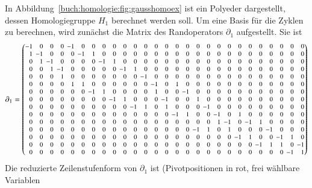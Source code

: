 \begin{beispiel}
\label{buch:homologie:beispiel:gausshomo}
In Abbildung~\ref{buch:homologie:fig:gausshomoex} ist ein Polyeder 
dargestellt, dessen Homologiegruppe $H_1$ berechnet werden soll.
Um eine Basis für die Zyklen zu berechnen, wird zunächst die Matrix
des Randoperators $\partial_1$ aufgestellt.
Sie ist
\[
\setcounter{MaxMatrixCols}{27}
\partial_1
=
\footnotesize
\setlength\arraycolsep{2pt}
\begin{pmatrix*}[r]
-1& 0& 0& 0&-1& 0& 0& 0& 0& 0& 0& 0& 0& 0& 0& 0& 0& 0& 0& 0& 0& 0& 0& 0& 0& 0& 0\\ %
 1&-1& 0& 0& 0&-1& 1& 0& 0& 0& 0& 0& 0& 0& 0& 0& 0& 0& 0& 0& 0& 0& 0& 0& 0& 0& 0\\ %
 0& 1&-1& 0& 0& 0& 0&-1& 1& 0& 0& 0& 0& 0& 0& 0& 0& 0& 0& 0& 0& 0& 0& 0& 0& 0& 0\\ %
 0& 0& 1&-1& 0& 0& 0& 0& 0&-1& 1& 0& 0& 0& 0& 0& 0& 0& 0& 0& 0& 0& 0& 0& 0& 0& 0\\ %
 0& 0& 0& 1& 0& 0& 0& 0& 0& 0& 0&-1& 0& 0& 0& 0& 0& 0& 0& 0& 0& 0& 0& 0& 0& 0& 0\\ %
 0& 0& 0& 0& 1& 1& 0& 0& 0& 0& 0& 0&-1& 0& 1& 0& 0& 0& 0& 0& 0& 0& 0& 0& 0& 0& 0\\ %
 0& 0& 0& 0& 0& 0&-1& 1& 0& 0& 0& 0& 1& 0& 0&-1& 0& 0& 0& 0& 0& 0& 0& 0& 0& 0& 0\\ %
 0& 0& 0& 0& 0& 0& 0& 0&-1& 1& 0& 0& 0&-1& 0& 0& 1& 0& 0& 0& 0& 0& 0& 0& 0& 0& 0\\ %
 0& 0& 0& 0& 0& 0& 0& 0& 0& 0&-1& 1& 0& 1& 0& 0& 0&-1& 0& 0& 0& 0& 0& 0& 0& 0& 0\\ %
 0& 0& 0& 0& 0& 0& 0& 0& 0& 0& 0& 0& 0& 0&-1& 1& 0& 0&-1& 0& 1& 0& 0& 0& 0& 0& 0\\ %
 0& 0& 0& 0& 0& 0& 0& 0& 0& 0& 0& 0& 0& 0& 0& 0& 0& 0& 1&-1& 0&-1& 1& 0& 0& 0& 0\\ %
 0& 0& 0& 0& 0& 0& 0& 0& 0& 0& 0& 0& 0& 0& 0& 0&-1& 1& 0& 1& 0& 0& 0&-1& 0& 0& 0\\ %
 0& 0& 0& 0& 0& 0& 0& 0& 0& 0& 0& 0& 0& 0& 0& 0& 0& 0& 0& 0&-1& 1& 0& 0&-1& 1& 0\\ %
 0& 0& 0& 0& 0& 0& 0& 0& 0& 0& 0& 0& 0& 0& 0& 0& 0& 0& 0& 0& 0& 0&-1& 1& 1& 0&-1\\ %
 0& 0& 0& 0& 0& 0& 0& 0& 0& 0& 0& 0& 0& 0& 0& 0& 0& 0& 0& 0& 0& 0& 0& 0& 0&-1& 1\\ %
\end{pmatrix*}
\]
Die reduzierte Zeilenstufenform von $\partial_1$ ist
(Pivotpositionen in {\color{red}rot}, frei wählbare Variablen

\end{beispiel}
